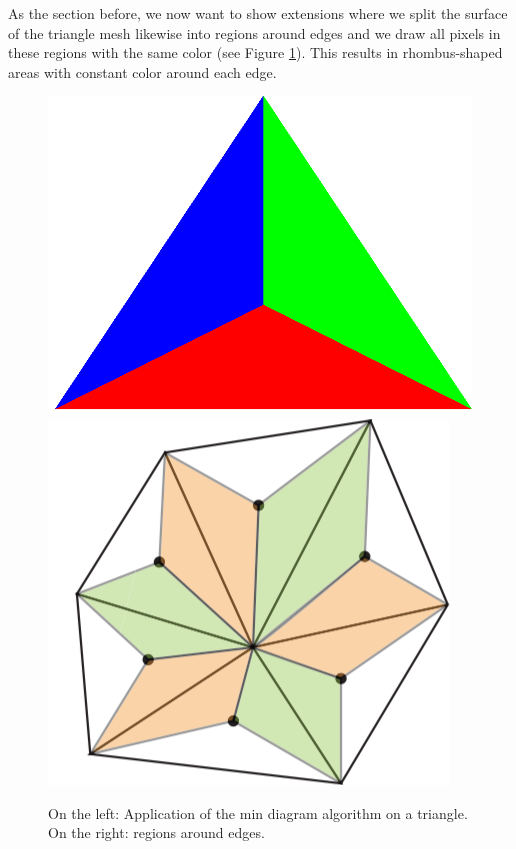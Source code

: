 \label{section:edge-area-chapter}
As the section before, we now want to show extensions where we split the surface of the triangle mesh likewise into regions around  edges and we draw all pixels in these regions with the same color (see Figure \ref{fig:min-area-edge}). This results in rhombus-shaped areas with constant color around each edge.

\begin{figure}[!h]
    \centering
    \centering
    \includegraphics[scale=0.15]{images/min.png}
    \endminipage\hfill
    \centering
    \includegraphics[scale=0.53]{images/edge-area.png}
    \endminipage
    \caption{On the left: Application of the min diagram algorithm on a triangle. On the right: regions around edges.} \label{fig:min-area-edge}
\end{figure}


